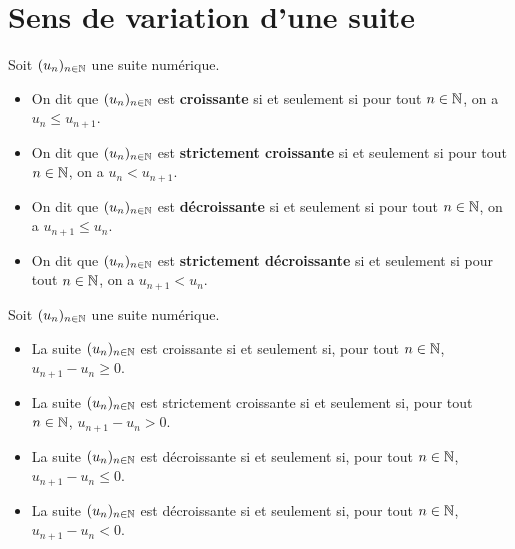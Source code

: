 \documentclass{poly}
\begin{document}
\section{Sens de variation d'une suite}
\begin{definition}
Soit $(u_n)_{n \in \mathbb{N}}$ une suite numérique.
\begin{itemize}
\item On dit que $(u_n)_{n \in \mathbb{N}}$ est \textbf{croissante} si et seulement si pour tout $n \in \mathbb{N}$, on a $u_n \leq u_{n+1}$.
\item On dit que $(u_n)_{n \in \mathbb{N}}$ est \textbf{strictement croissante} si et seulement si pour tout $n \in \mathbb{N}$, on a $u_n < u_{n+1}$.
\item On dit que $(u_n)_{n \in \mathbb{N}}$ est \textbf{décroissante} si et seulement si pour tout $n \in \mathbb{N}$, on a $u_{n+1} \leq u_n$. 
\item On dit que $(u_n)_{n \in \mathbb{N}}$ est \textbf{strictement décroissante} si et seulement si pour tout $n \in \mathbb{N}$, on a $u_{n+1} < u_n$. 
\end{itemize}
\end{definition}
\begin{proposition}
Soit $(u_n)_{n \in \mathbb{N}}$ une suite numérique.
\begin{itemize}
\item La suite $(u_n)_{n \in \mathbb{N}}$ est croissante si et seulement si, pour tout $n \in \mathbb{N}$, $u_{n+1} - u_n \geq 0$. 
\item La suite $(u_n)_{n \in \mathbb{N}}$ est strictement croissante si et seulement si, pour tout $n \in \mathbb{N}$, $u_{n+1} - u_n > 0$. 
\item La suite $(u_n)_{n \in \mathbb{N}}$ est décroissante si et seulement si, pour tout $n \in \mathbb{N}$, $u_{n+1} - u_n \leq 0$. 
\item La suite $(u_n)_{n \in \mathbb{N}}$ est décroissante si et seulement si, pour tout $n \in \mathbb{N}$, $u_{n+1} - u_n < 0$. 
\end{itemize}
\end{proposition}
\end{document}
